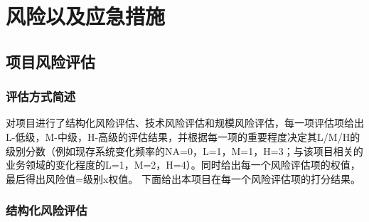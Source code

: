 \documentclass[hyperref, a4paper]{ctexart}
\begin{document}
\hypertarget{ux98ceux9669ux4ee5ux53caux5e94ux6025ux63aaux65bd}{%
\section{风险以及应急措施}\label{ux98ceux9669ux4ee5ux53caux5e94ux6025ux63aaux65bd}}

\hypertarget{ux9879ux76eeux98ceux9669ux8bc4ux4f30}{%
\subsection{项目风险评估}\label{ux9879ux76eeux98ceux9669ux8bc4ux4f30}}

\hypertarget{ux8bc4ux4f30ux65b9ux5f0fux7b80ux8ff0}{%
\subsubsection{评估方式简述}\label{ux8bc4ux4f30ux65b9ux5f0fux7b80ux8ff0}}

对项目进行了结构化风险评估、技术风险评估和规模风险评估，每一项评估项给出L-低级，M-中级，H-高级的评估结果，并根据每一项的重要程度决定其L/M/H的级别分数（例如现存系统变化频率的NA=0，L=1，M=1，H=3；与该项目相关的业务领域的变化程度的L=1，M=2，H=4）。同时给出每一个风险评估项的权值，最后得出风险值=级别x权值。\newline
下面给出本项目在每一个风险评估项的打分结果。

\hypertarget{ux7ed3ux6784ux5316ux98ceux9669ux8bc4ux4f30}{%
\subsubsection{结构化风险评估}\label{ux7ed3ux6784ux5316ux98ceux9669ux8bc4ux4f30}}
\end{document}
